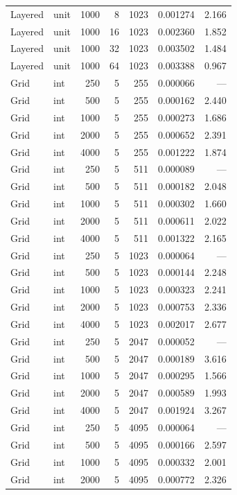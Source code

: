 \begin{longtable}{l l r r r r r}
Layered & unit & 1000 & 8 & 1023 & 0.001274 & 2.166 \\
Layered & unit & 1000 & 16 & 1023 & 0.002360 & 1.852 \\
Layered & unit & 1000 & 32 & 1023 & 0.003502 & 1.484 \\
Layered & unit & 1000 & 64 & 1023 & 0.003388 & 0.967 \\
\addlinespace
Grid & int & 250 & 5 & 255 & 0.000066 & --- \\
Grid & int & 500 & 5 & 255 & 0.000162 & 2.440 \\
Grid & int & 1000 & 5 & 255 & 0.000273 & 1.686 \\
Grid & int & 2000 & 5 & 255 & 0.000652 & 2.391 \\
Grid & int & 4000 & 5 & 255 & 0.001222 & 1.874 \\
\addlinespace
Grid & int & 250 & 5 & 511 & 0.000089 & --- \\
Grid & int & 500 & 5 & 511 & 0.000182 & 2.048 \\
Grid & int & 1000 & 5 & 511 & 0.000302 & 1.660 \\
Grid & int & 2000 & 5 & 511 & 0.000611 & 2.022 \\
Grid & int & 4000 & 5 & 511 & 0.001322 & 2.165 \\
\addlinespace
Grid & int & 250 & 5 & 1023 & 0.000064 & --- \\
Grid & int & 500 & 5 & 1023 & 0.000144 & 2.248 \\
Grid & int & 1000 & 5 & 1023 & 0.000323 & 2.241 \\
Grid & int & 2000 & 5 & 1023 & 0.000753 & 2.336 \\
Grid & int & 4000 & 5 & 1023 & 0.002017 & 2.677 \\
\addlinespace
Grid & int & 250 & 5 & 2047 & 0.000052 & --- \\
Grid & int & 500 & 5 & 2047 & 0.000189 & 3.616 \\
Grid & int & 1000 & 5 & 2047 & 0.000295 & 1.566 \\
Grid & int & 2000 & 5 & 2047 & 0.000589 & 1.993 \\
Grid & int & 4000 & 5 & 2047 & 0.001924 & 3.267 \\
\addlinespace
Grid & int & 250 & 5 & 4095 & 0.000064 & --- \\
Grid & int & 500 & 5 & 4095 & 0.000166 & 2.597 \\
Grid & int & 1000 & 5 & 4095 & 0.000332 & 2.001 \\
Grid & int & 2000 & 5 & 4095 & 0.000772 & 2.326 \\

\end{longtable}
